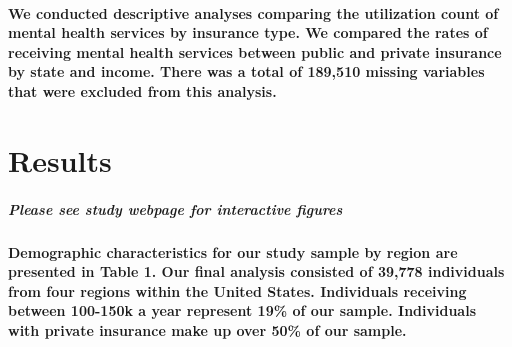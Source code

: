 \documentclass[
  12pt,
]{article}
\begin{document}
\hypertarget{we-conducted-descriptive-analyses-comparing-the-utilization-count-of-mental-health-services-by-insurance-type.-we-compared-the-rates-of-receiving-mental-health-services-between-public-and-private-insurance-by-state-and-income.-there-was-a-total-of-189510-missing-variables-that-were-excluded-from-this-analysis.}{%
\paragraph{We conducted descriptive analyses comparing the utilization
count of mental health services by insurance type. We compared the rates
of receiving mental health services between public and private insurance
by state and income. There was a total of 189,510 missing variables that
were excluded from this
analysis.}\label{we-conducted-descriptive-analyses-comparing-the-utilization-count-of-mental-health-services-by-insurance-type.-we-compared-the-rates-of-receiving-mental-health-services-between-public-and-private-insurance-by-state-and-income.-there-was-a-total-of-189510-missing-variables-that-were-excluded-from-this-analysis.}}

\hypertarget{results}{%
\section{\texorpdfstring{\textbf{Results}}{Results}}\label{results}}

\hypertarget{please-see-study-webpage-for-interactive-figures}{%
\subparagraph{Please see study webpage for interactive
figures}\label{please-see-study-webpage-for-interactive-figures}}

\hypertarget{demographic-characteristics-for-our-study-sample-by-region-are-presented-in-table-1.-our-final-analysis-consisted-of-39778-individuals-from-four-regions-within-the-united-states.-individuals-receiving-between-100-150k-a-year-represent-19-of-our-sample.-individuals-with-private-insurance-make-up-over-50-of-our-sample.}{%
\paragraph{Demographic characteristics for our study sample by region
are presented in Table 1. Our final analysis consisted of 39,778
individuals from four regions within the United States. Individuals
receiving between 100-150k a year represent 19\% of our sample.
Individuals with private insurance make up over 50\% of our
sample.}\label{demographic-characteristics-for-our-study-sample-by-region-are-presented-in-table-1.-our-final-analysis-consisted-of-39778-individuals-from-four-regions-within-the-united-states.-individuals-receiving-between-100-150k-a-year-represent-19-of-our-sample.-individuals-with-private-insurance-make-up-over-50-of-our-sample.}}
\end{document}
